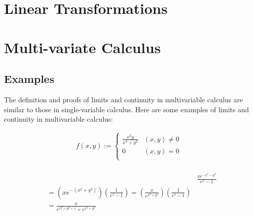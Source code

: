 \documentclass{article}
\begin{document}
\section{Linear Transformations}

\section{Multi-variate Calculus}

\subsection{Examples}

The definition and proofs of limits and continuity in multivariable calculus are similar to those in single-variable calculus. Here are some examples of limits and continuity in multivariable calculus:

\begin{align}
    f(x,y) := 
    \begin{cases}
    \frac{x^2 y}{x^4 + y^2} & (x,y) \neq 0 \\
    0 & (x,y) = 0 \\
    \end{cases} \\
\end{align}

\begin{align}
    &&\frac{xe^{-x^{2}-y^{2}}}{e^x - 1} \\
    &= (xe^{-(x^2+y^2)})(\frac{1}{e^x - 1}) = (\frac{x}{e^{x^2+y^2}})(\frac{1}{e^x - 1}) \\
    &= \frac{x}{e^{x^2+y^2+x} + e^{x^2+y^2}}
\end{align}
\end{document}
